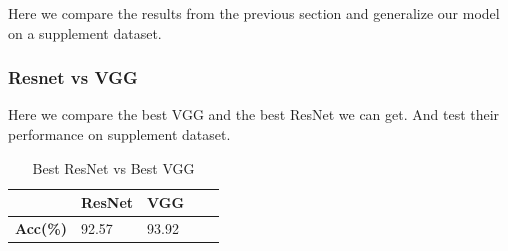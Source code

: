 \documentclass[lang=english,inputenc=utf8,fontsize=10pt]{ldvarticle}
\begin{document}
Here we compare the results from the previous section and generalize our model on a supplement dataset.
\subsubsection{Resnet vs VGG}
    Here we compare the best VGG and the best ResNet we can get. And test their performance on supplement dataset. 
    \begin{table}[H]   
    \begin{center}   
    \caption{Best ResNet vs Best VGG}  
    \label{Resnet vs VGG} 
    \begin{tabular}{|m{2cm}<{\centering}|m{2cm}<{\centering}|m{2.0cm}<{\centering}|m{2cm}<{\centering}|m{2cm}<{\centering}|}   
    \hline   &\textbf{ResNet} & \textbf{VGG}\\ 
    \hline   \textbf{Acc(\%)}  & 92.57 & 93.92   \\ 
    \hline 
    \end{tabular}   
    \end{center}   
    \end{table}
    
\end{document}
